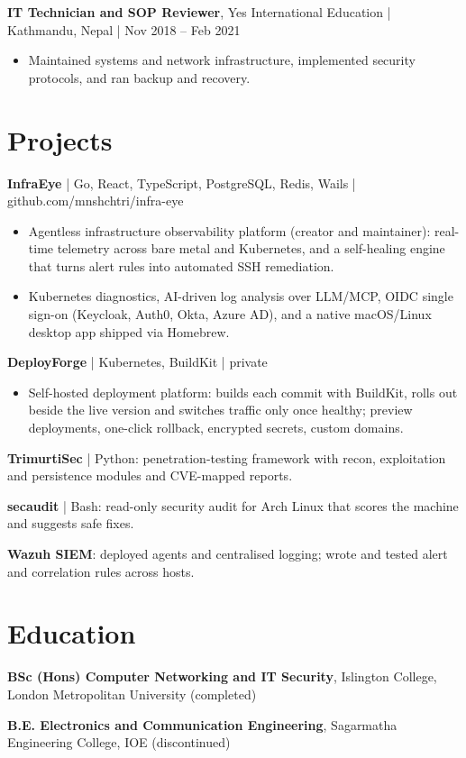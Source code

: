 \documentclass[10pt]{article}
\newcommand{\job}[4]{%
    \textbf{#1}, #2 {\color{darkgray}| #4 | #3}\par}
\newcommand{\project}[3]{%
    \textbf{#1} {\color{darkgray}| #2 | #3}\par}
\begin{document}
\vspace{2pt}
\job{IT Technician and SOP Reviewer}{Yes International Education}{Nov 2018 -- Feb 2021}{Kathmandu, Nepal}
\begin{itemize}
    \item Maintained systems and network infrastructure, implemented security protocols, and ran backup and recovery.
\end{itemize}

\section{Projects}
\project{InfraEye}{Go, React, TypeScript, PostgreSQL, Redis, Wails}{github.com/mnshchtri/infra-eye}
\begin{itemize}
    \item Agentless infrastructure observability platform (creator and maintainer): real-time telemetry across bare metal and Kubernetes, and a self-healing engine that turns alert rules into automated SSH remediation.
    \item Kubernetes diagnostics, AI-driven log analysis over LLM/MCP, OIDC single sign-on (Keycloak, Auth0, Okta, Azure AD), and a native macOS/Linux desktop app shipped via Homebrew.
\end{itemize}
\project{DeployForge}{Kubernetes, BuildKit}{private}
\begin{itemize}
    \item Self-hosted deployment platform: builds each commit with BuildKit, rolls out beside the live version and switches traffic only once healthy; preview deployments, one-click rollback, encrypted secrets, custom domains.
\end{itemize}
\vspace{1pt}
\textbf{TrimurtiSec} {\color{darkgray}| Python}: penetration-testing framework with recon, exploitation and persistence modules and CVE-mapped reports.\par
\textbf{secaudit} {\color{darkgray}| Bash}: read-only security audit for Arch Linux that scores the machine and suggests safe fixes.\par
\textbf{Wazuh SIEM}: deployed agents and centralised logging; wrote and tested alert and correlation rules across hosts.\par

\section{Education}
\textbf{BSc (Hons) Computer Networking and IT Security}, Islington College, London Metropolitan University (completed)\par
\textbf{B.E. Electronics and Communication Engineering}, Sagarmatha Engineering College, IOE (discontinued)\par
\end{document}
